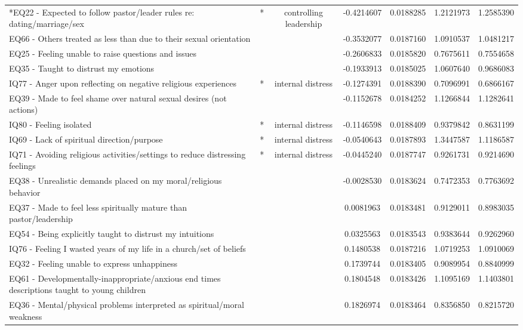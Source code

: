 \documentclass[
]{article}
\begin{document}
\begin{longtable}[t]{>{\raggedright\arraybackslash}p{11cm}cccccc}
\endfoot
\bottomrule
\endlastfoot
*EQ22 - Expected to follow pastor/leader rules re: dating/marriage/sex & * & controlling leadership & -0.4214607 & 0.0188285 & 1.2121973 & 1.2585390\\
EQ66 - Others treated as less than due to their sexual orientation &  &  & -0.3532077 & 0.0187160 & 1.0910537 & 1.0481217\\
EQ25 - Feeling unable to raise questions and issues &  &  & -0.2606833 & 0.0185820 & 0.7675611 & 0.7554658\\
EQ35 - Taught to distrust my emotions &  &  & -0.1933913 & 0.0185025 & 1.0607640 & 0.9686083\\
*IQ77 - Anger upon reflecting on negative religious experiences & * & internal distress & -0.1274391 & 0.0188390 & 0.7096991 & 0.6866167\\
\addlinespace
EQ39 - Made to feel shame over natural sexual desires (not actions) &  &  & -0.1152678 & 0.0184252 & 1.1266844 & 1.1282641\\
*IQ80 - Feeling isolated & * & internal distress & -0.1146598 & 0.0188409 & 0.9379842 & 0.8631199\\
*IQ69 - Lack of spiritual direction/purpose & * & internal distress & -0.0540643 & 0.0187893 & 1.3447587 & 1.1186587\\
*IQ71 - Avoiding religious activities/settings to reduce distressing feelings & * & internal distress & -0.0445240 & 0.0187747 & 0.9261731 & 0.9214690\\
EQ38 - Unrealistic demands placed on my moral/religious behavior &  &  & -0.0028530 & 0.0183624 & 0.7472353 & 0.7763692\\
\addlinespace
EQ37 - Made to feel less spiritually mature than pastor/leadership &  &  & 0.0081963 & 0.0183481 & 0.9129011 & 0.8983035\\
EQ54 - Being explicitly taught to distrust my intuitions &  &  & 0.0325563 & 0.0183543 & 0.9383644 & 0.9262960\\
IQ76 - Feeling I wasted years of my life in a church/set of beliefs &  &  & 0.1480538 & 0.0187216 & 1.0719253 & 1.0910069\\
EQ32 - Feeling unable to express unhappiness &  &  & 0.1739744 & 0.0183405 & 0.9089954 & 0.8840999\\
EQ61 - Developmentally-inappropriate/anxious end times descriptions taught to young children &  &  & 0.1804548 & 0.0183426 & 1.1095169 & 1.1403801\\
\addlinespace
EQ36 - Mental/physical problems interpreted as spiritual/moral weakness &  &  & 0.1826974 & 0.0183464 & 0.8356850 & 0.8215720\\

\end{longtable}
\end{document}

